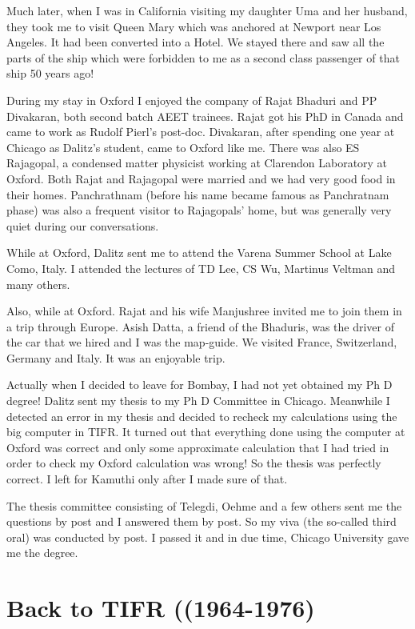 Much later, when I was in California visiting my daughter Uma and her 
husband, they took me to visit Queen Mary which was anchored at Newport 
near Los Angeles. It had been converted into a Hotel. We stayed there 
and saw all the parts of the ship which were forbidden to me as a second 
class passenger of that ship 50 years ago!

During my stay in Oxford I enjoyed the company of Rajat Bhaduri and PP 
Divakaran, both second batch AEET trainees. Rajat got his PhD in Canada 
and came to work as Rudolf Pierl's post-doc. Divakaran, after spending 
one year at Chicago as Dalitz's student, came to Oxford like me. There 
was also ES Rajagopal, a condensed matter physicist working at Clarendon 
Laboratory at Oxford. Both Rajat and Rajagopal were married and we had 
very good food in their homes. Panchrathnam (before his name became 
famous as Panchratnam phase) was also a frequent visitor to Rajagopals' 
home, but was generally very quiet during our conversations.

While at Oxford, Dalitz sent me to attend the Varena Summer School at 
Lake Como, Italy. I attended the lectures of TD Lee, CS Wu, Martinus 
Veltman and many others.

Also, while at Oxford. Rajat and his wife Manjushree invited me to join 
them in a trip through Europe. Asish Datta, a friend of the Bhaduris, 
was the driver of the car that we hired and I was the map-guide. We 
visited France, Switzerland, Germany and Italy. It was an enjoyable 
trip.
 
Actually when I decided to leave for Bombay, I had not yet obtained my 
Ph D degree! Dalitz sent my thesis to my Ph D Committee in Chicago. 
Meanwhile I detected an error in my thesis and decided to recheck my 
calculations using the big computer in TIFR. It turned out that 
everything done using the computer at Oxford was correct and only some 
approximate calculation that I had tried in order to check my Oxford 
calculation was wrong! So the thesis was perfectly correct. I left for 
Kamuthi only after I made sure of that.

The thesis committee consisting of Telegdi, Oehme and a few others sent 
me the questions by post and I answered them by post. So my viva (the 
so-called third oral) was conducted by post. I passed it and in due 
time, Chicago University gave me the degree.

\section*{Back to TIFR ((1964-1976)}

